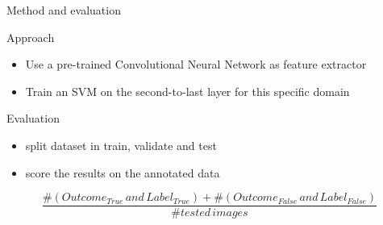 \documentclass{beamer}
\begin{document}
    \begin{frame}{Method and evaluation}
        \begin{block}{Approach}
            \begin{itemize}
            \item Use a pre-trained Convolutional Neural Network as feature extractor
            \item Train an SVM on the second-to-last layer for this specific domain
            \end{itemize}
        \end{block}
        \begin{block}{Evaluation}
            \begin{itemize}
            \item split dataset in train, validate and test
            \item score the results on the annotated data
            \end{itemize}
            \[
\frac{\#(Outcome_{True}\,and\,Label_{True})+\#(Outcome_{False}\,and\,Label_{False})}{\#tested\,images}
\]
        \end{block}
    \end{frame}
\end{document}
